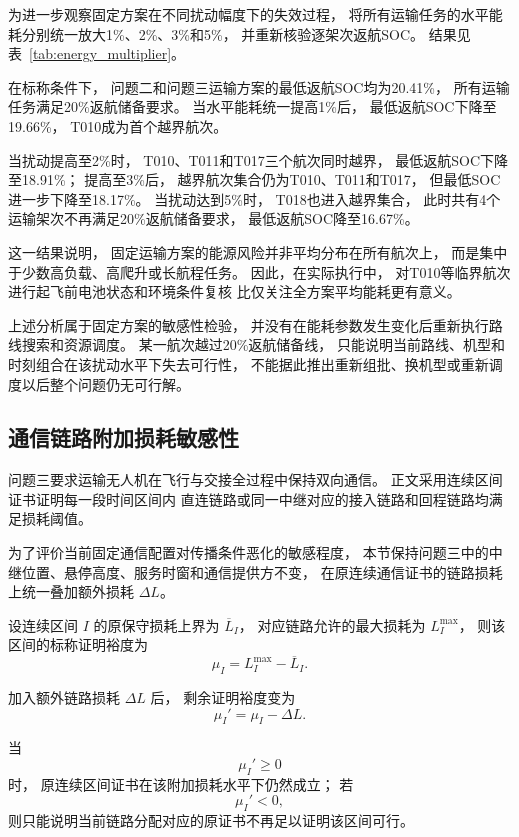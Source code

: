 为进一步观察固定方案在不同扰动幅度下的失效过程，
将所有运输任务的水平能耗分别统一放大1\%、2\%、3\%和5\%，
并重新核验逐架次返航SOC。
结果见表~\ref{tab:energy_multiplier}。



在标称条件下，
问题二和问题三运输方案的最低返航SOC均为20.41\%，
所有运输任务满足20\%返航储备要求。
当水平能耗统一提高1\%后，
最低返航SOC下降至19.66\%，
T010成为首个越界航次。

当扰动提高至2\%时，
T010、T011和T017三个航次同时越界，
最低返航SOC下降至18.91\%；
提高至3\%后，
越界航次集合仍为T010、T011和T017，
但最低SOC进一步下降至18.17\%。
当扰动达到5\%时，
T018也进入越界集合，
此时共有4个运输架次不再满足20\%返航储备要求，
最低返航SOC降至16.67\%。

这一结果说明，
固定运输方案的能源风险并非平均分布在所有航次上，
而是集中于少数高负载、高爬升或长航程任务。
因此，在实际执行中，
对T010等临界航次进行起飞前电池状态和环境条件复核
比仅关注全方案平均能耗更有意义。

上述分析属于固定方案的敏感性检验，
并没有在能耗参数发生变化后重新执行路线搜索和资源调度。
某一航次越过20\%返航储备线，
只能说明当前路线、机型和时刻组合在该扰动水平下失去可行性，
不能据此推出重新组批、换机型或重新调度以后整个问题仍无可行解。

\subsection{通信链路附加损耗敏感性}

问题三要求运输无人机在飞行与交接全过程中保持双向通信。
正文采用连续区间证书证明每一段时间区间内
直连链路或同一中继对应的接入链路和回程链路均满足损耗阈值。

为了评价当前固定通信配置对传播条件恶化的敏感程度，
本节保持问题三中的中继位置、悬停高度、服务时窗和通信提供方不变，
在原连续通信证书的链路损耗上统一叠加额外损耗
$\Delta L$。

设连续区间 $I$ 的原保守损耗上界为
$\overline L_I$，
对应链路允许的最大损耗为
$L_I^{\max}$，
则该区间的标称证明裕度为
\begin{equation}
\mu_I
=
L_I^{\max}
-
\overline L_I.
\end{equation}

加入额外链路损耗
$\Delta L$ 后，
剩余证明裕度变为
\begin{equation}
\mu_I'
=
\mu_I-\Delta L.
\end{equation}

当
\begin{equation}
\mu_I'\geq 0
\end{equation}
时，
原连续区间证书在该附加损耗水平下仍然成立；
若
\begin{equation}
\mu_I'<0,
\end{equation}
则只能说明当前链路分配对应的原证书不再足以证明该区间可行。

